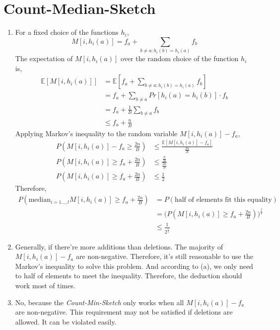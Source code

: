 \documentclass[11pt]{article}
\newenvironment{qparts}{\begin{enumerate}[{(}a{)}]}{\end{enumerate}}
\begin{document}
\newpage
\section{Count-Median-Sketch}

\begin{qparts}
	\item 
	
	For a fixed choice of the functions $h_i$,
	\[
		M[i, h_i(a)] = f_a + \sum_{b\ne a:h_i(b)=h_i(a)} f_b
	\]
	The expectation of $M[i,h_i(a)]$ over the random choice of the function $h_i$ is,
	\begin{align*}
		\mathbb{E}[M[i, h_i(a)]]
		&=
		\mathbb{E}[ f_a + \sum_{b\ne a:h_i(b)=h_i(a)} f_b] \\
		&=
		f_a + \sum_{b \ne a}Pr[h_i(a) = h_i(b)] \cdot f_b \\
		&=
		f_a + \frac{1}{B}\sum_{b \ne a} f_b \\
		&\le
		f_a + \frac{n}{B}
	\end{align*}
	Applying Markov’s inequality to the random variable $M[i,h_i(a)]-f_a$,
	\begin{align*}
		P(M[i,h_i(a)]-f_a \ge \frac{2n}{B})
		&\le
		\frac{\mathbb{E}[M[i,h_i(a)]-f_a]}{\frac{2n}{B}} \\
		P(M[i,h_i(a)] \ge f_a + \frac{2n}{B})
		&\le
		\frac{\frac{n}{B}}{\frac{2n}{B}} \\
		P(M[i,h_i(a)] \ge f_a + \frac{2n}{B})
		&\le
		\frac{1}{2}
	\end{align*}
	Therefore,
	\begin{align*}
		P(\text{median}_{i = 1\dots, l} M[i,h_i(a)] \ge f_a + \frac{2n}{B})
		&=
		P(\text{half of elements fit this equality}) \\
		&= 
		\Big (P(M[i,h_i(a)] \ge f_a + \frac{2n}{B}) \Big)^{\frac{l}{2}} \\
		&\le
		\frac{1}{2^{\frac{l}{2}}}
	\end{align*}	
	
	
	\item
	
	Generally, if there're more additions than deletions. The majority of $M[i,h_i(a)]-f_a$ are non-negative. Therefore, it's still reasonable to use the Markov’s inequality to solve this problem. And according to (a), we only need to half of elements to meet the inequality. Therefore, the deduction should work most of times.
	
	\item
	
	No, because the \textit{Count-Min-Sketch} only works when all $M[i,h_i(a)]-f_a$ are non-negative. This requirement may not be satisfied if deletions are allowed. It can be violated easily.
	

\end{qparts}
\end{document}
